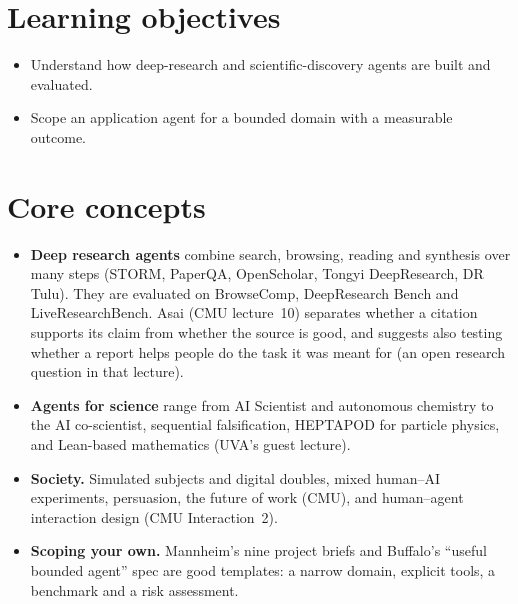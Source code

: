 \documentclass[10pt,oneside]{report}
\begin{document}
\section{Learning objectives}
\begin{itemize}
\item Understand how deep-research and scientific-discovery agents are built and evaluated.
\item Scope an application agent for a bounded domain with a measurable outcome.
\end{itemize}
\section{Core concepts}
\begin{itemize}
\item \textbf{Deep research agents} combine search, browsing, reading and synthesis over many steps (STORM, PaperQA, OpenScholar, Tongyi DeepResearch, DR Tulu). They are evaluated on BrowseComp, DeepResearch Bench and LiveResearchBench. Asai (CMU lecture~10) separates whether a citation supports its claim from whether the source is good, and suggests also testing whether a report helps people do the task it was meant for (an open research question in that lecture).
\item \textbf{Agents for science} range from AI Scientist and autonomous chemistry to the AI co-scientist, sequential falsification, HEPTAPOD for particle physics, and Lean-based mathematics (UVA's guest lecture).
\item \textbf{Society.} Simulated subjects and digital doubles, mixed human--AI experiments, persuasion, the future of work (CMU), and human--agent interaction design (CMU Interaction~2).
\item \textbf{Scoping your own.} Mannheim's nine project briefs and Buffalo's ``useful bounded agent'' spec are good templates: a narrow domain, explicit tools, a benchmark and a risk assessment.
\end{itemize}
\end{document}
